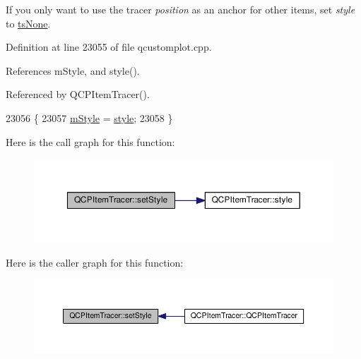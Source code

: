 If you only want to use the tracer {\itshape position} as an anchor for other items, set {\itshape style} to \hyperlink{class_q_c_p_item_tracer_a2f05ddb13978036f902ca3ab47076500aac27462c79146225bfa8fba24d2ee8a4}{ts\+None}. 

Definition at line 23055 of file qcustomplot.\+cpp.



References m\+Style, and style().



Referenced by Q\+C\+P\+Item\+Tracer().


\begin{DoxyCode}
23056 \{
23057   \hyperlink{class_q_c_p_item_tracer_afb1f236bebf417544e0138fef22a292e}{mStyle} = \hyperlink{class_q_c_p_item_tracer_a871832dace1709f877c3136fac7ae1ec}{style};
23058 \}
\end{DoxyCode}


Here is the call graph for this function\+:\nopagebreak
\begin{figure}[H]
\begin{center}
\leavevmode
\includegraphics[width=350pt]{class_q_c_p_item_tracer_a41a2ac4f1acd7897b4e2a2579c03204e_cgraph}
\end{center}
\end{figure}




Here is the caller graph for this function\+:\nopagebreak
\begin{figure}[H]
\begin{center}
\leavevmode
\includegraphics[width=350pt]{class_q_c_p_item_tracer_a41a2ac4f1acd7897b4e2a2579c03204e_icgraph}
\end{center}
\end{figure}


\hypertarget{class_q_c_p_item_tracer_a2607fcb3d01e90773ea1532fd6803760}{}
